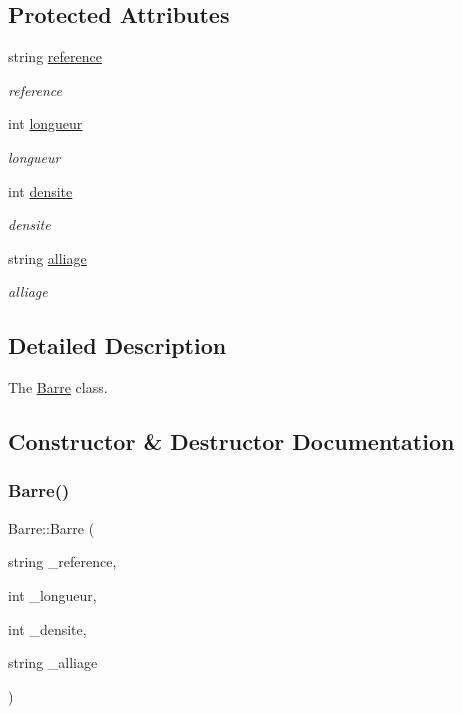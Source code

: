 \subsection*{Protected Attributes}
\begin{DoxyCompactItemize}
\item 
string \hyperlink{class_barre_a787dda4b06eba9eac805fc67720d4a11}{reference}
\begin{DoxyCompactList}\small\item\em reference \end{DoxyCompactList}\item 
int \hyperlink{class_barre_a59f5637eaf9c15084deafab15f0de07d}{longueur}
\begin{DoxyCompactList}\small\item\em longueur \end{DoxyCompactList}\item 
int \hyperlink{class_barre_ac1cd6c9bf264de964edf9ab0b2c40519}{densite}
\begin{DoxyCompactList}\small\item\em densite \end{DoxyCompactList}\item 
string \hyperlink{class_barre_a563afd4a7499371c8ad33ac807fc4dbf}{alliage}
\begin{DoxyCompactList}\small\item\em alliage \end{DoxyCompactList}\end{DoxyCompactItemize}


\subsection{Detailed Description}
The \hyperlink{class_barre}{Barre} class. 

\subsection{Constructor \& Destructor Documentation}
\mbox{\label{class_barre_a9de18a6ba5cbea5bb3cd95b52450eea0}} 
\subsubsection{\texorpdfstring{Barre()}{Barre()}}
{\footnotesize\ttfamily Barre\+::\+Barre (\begin{DoxyParamCaption}\item[{string}]{\+\_\+reference,  }\item[{int}]{\+\_\+longueur,  }\item[{int}]{\+\_\+densite,  }\item[{string}]{\+\_\+alliage }\end{DoxyParamCaption})}



